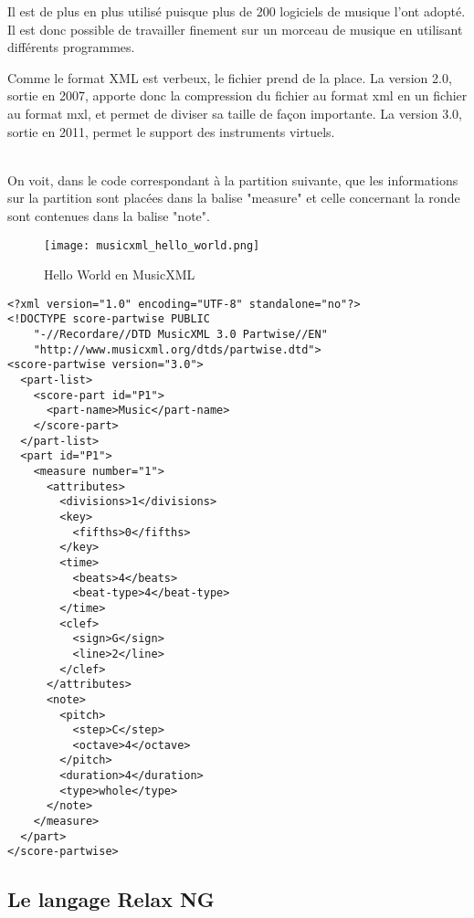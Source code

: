 \par
Il est de plus en plus utilisé puisque plus de 200 logiciels de musique l’ont adopté. Il est donc possible de travailler finement sur un morceau de musique en utilisant différents programmes.

\par
Comme le format XML est verbeux, le fichier prend de la place. La version 2.0, sortie en 2007, apporte donc la compression du fichier au format xml en un fichier au format mxl, et permet de diviser sa taille de façon importante. La version 3.0, sortie en 2011, permet le support des instruments virtuels.\\~\\

\par
On voit, dans le code correspondant à la partition suivante, que les informations sur la partition sont placées dans la balise "measure" et celle concernant la ronde sont contenues dans la balise "note".

\begin{figure}[!h] %
\centering
\texttt{[image: musicxml\_hello\_world.png]}\\[1cm]
\caption{Hello World en MusicXML}
\label{Hello World en MusicXML}
\end{figure}


\begin{lstlisting}[caption=Document XML d'un Hello World en MusicXML, label=ruleml]
<?xml version="1.0" encoding="UTF-8" standalone="no"?>
<!DOCTYPE score-partwise PUBLIC
    "-//Recordare//DTD MusicXML 3.0 Partwise//EN"
    "http://www.musicxml.org/dtds/partwise.dtd">
<score-partwise version="3.0">
  <part-list>
    <score-part id="P1">
      <part-name>Music</part-name>
    </score-part>
  </part-list>
  <part id="P1">
    <measure number="1">
      <attributes>
        <divisions>1</divisions>
        <key>
          <fifths>0</fifths>
        </key>
        <time>
          <beats>4</beats>
          <beat-type>4</beat-type>
        </time>
        <clef>
          <sign>G</sign>
          <line>2</line>
        </clef>
      </attributes>
      <note>
        <pitch>
          <step>C</step>
          <octave>4</octave>
        </pitch>
        <duration>4</duration>
        <type>whole</type>
      </note>
    </measure>
  </part>
</score-partwise>
\end{lstlisting}


\subsection{Le langage Relax NG}

